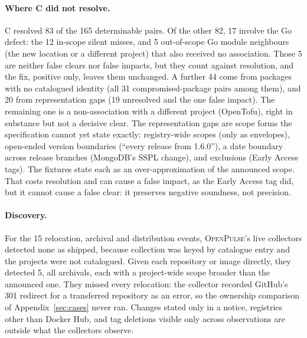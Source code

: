 \documentclass[11pt,a4paper]{article}
\newcommand{\op}{\textsc{OpenPulse}}
\begin{document}
\paragraph{Where C did not resolve.} C resolved 83 of the 165
determinable pairs. Of the other 82, 17 involve the Go defect: the 12
in-scope silent misses, and 5 out-of-scope Go module neighbours (the
new location or a different project) that also received no
association. Those 5 are neither false clears nor false impacts, but
they count against resolution, and the fix, positive only, leaves them
unchanged. A further 44 come from packages with no
catalogued identity (all 31 compromised-package pairs among them),
and 20 from representation gaps (19 unresolved
and the one false impact). The remaining one is a non-association with a
different project (OpenTofu), right in substance but not a decisive
clear. The representation
gaps are scope forms the specification cannot yet state exactly:
registry-wide scopes (only as envelopes), open-ended version
boundaries (``every release from 1.6.0''), a date boundary across
release branches (MongoDB's SSPL change), and exclusions (Early Access
tags). The fixtures state each as an over-approximation of the
announced scope. That costs resolution and can cause a false impact,
as the Early Access tag did, but it cannot cause a false clear: it
preserves negative soundness, not precision.

\paragraph{Discovery.} For the 15 relocation, archival and
distribution events, \op{}'s live collectors detected none as shipped,
because collection was keyed by catalogue entry and the projects were
not catalogued. Given each repository or image directly, they detected
5, all archivals, each with a project-wide scope broader than the
announced one. They missed every relocation: the collector recorded
GitHub's 301 redirect for a transferred repository as an error, so the
ownership comparison of Appendix~\ref{sec:cases} never ran. Changes
stated only in a notice, registries other than Docker Hub, and tag
deletions visible only across observations are outside what the
collectors observe.
\end{document}
